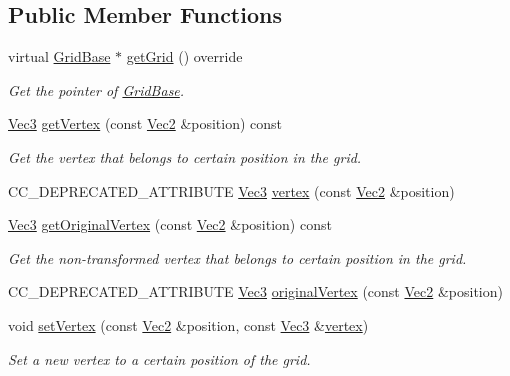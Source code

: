 \subsection*{Public Member Functions}
\begin{DoxyCompactItemize}
\item 
virtual \hyperlink{classGridBase}{Grid\+Base} $\ast$ \hyperlink{classGrid3DAction_ad68b52ba318636b43a4c7aab0a9c2887}{get\+Grid} () override
\begin{DoxyCompactList}\small\item\em Get the pointer of \hyperlink{classGridBase}{Grid\+Base}. \end{DoxyCompactList}\item 
\hyperlink{classVec3}{Vec3} \hyperlink{classGrid3DAction_a188dfc79a323f07b3aff441bced64201}{get\+Vertex} (const \hyperlink{classVec2}{Vec2} \&position) const
\begin{DoxyCompactList}\small\item\em Get the vertex that belongs to certain position in the grid. \end{DoxyCompactList}\item 
C\+C\+\_\+\+D\+E\+P\+R\+E\+C\+A\+T\+E\+D\+\_\+\+A\+T\+T\+R\+I\+B\+U\+TE \hyperlink{classVec3}{Vec3} \hyperlink{classGrid3DAction_a75b5c44d0729a43476dff9ab6e7b281c}{vertex} (const \hyperlink{classVec2}{Vec2} \&position)
\item 
\hyperlink{classVec3}{Vec3} \hyperlink{classGrid3DAction_a8e614d5c3c368b1f2eee4a3e885f861f}{get\+Original\+Vertex} (const \hyperlink{classVec2}{Vec2} \&position) const
\begin{DoxyCompactList}\small\item\em Get the non-\/transformed vertex that belongs to certain position in the grid. \end{DoxyCompactList}\item 
C\+C\+\_\+\+D\+E\+P\+R\+E\+C\+A\+T\+E\+D\+\_\+\+A\+T\+T\+R\+I\+B\+U\+TE \hyperlink{classVec3}{Vec3} \hyperlink{classGrid3DAction_aa9ab3e0d2e07ab0a8227bbbd9c0b2021}{original\+Vertex} (const \hyperlink{classVec2}{Vec2} \&position)
\item 
void \hyperlink{classGrid3DAction_a110cf4db66e0410d971d9f47e116fdbf}{set\+Vertex} (const \hyperlink{classVec2}{Vec2} \&position, const \hyperlink{classVec3}{Vec3} \&\hyperlink{classGrid3DAction_a75b5c44d0729a43476dff9ab6e7b281c}{vertex})
\begin{DoxyCompactList}\small\item\em Set a new vertex to a certain position of the grid. \end{DoxyCompactList}\item 

\end{DoxyCompactItemize}
